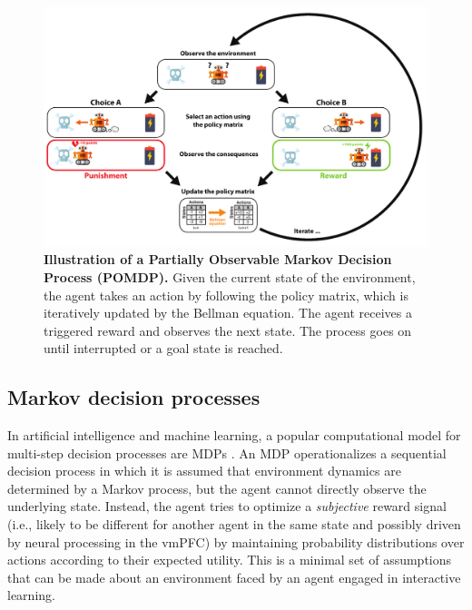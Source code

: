 \documentclass[10pt,letterpaper]{article}
\begin{document}
\begin{figure}[!h]
  \centering
  \includegraphics[width=1.\linewidth]{POMDP_Fig.pdf}
  \caption{\textbf{Illustration of a Partially Observable Markov Decision Process (POMDP).} Given the current state of the environment,
    the agent takes an action by following the policy matrix, which is iteratively updated by the Bellman equation. The agent receives a triggered reward and observes the next state. The process goes on until interrupted or a goal state is reached.}
  \label{fig:rl}
\end{figure}




\subsection{Markov decision processes}
In artificial intelligence and machine learning, a popular computational model for
multi-step decision processes are
MDPs \citep{sutton1998reinforcement}.
An MDP operationalizes a sequential decision process
in which it is assumed that environment dynamics are determined by a Markov process,
but the agent cannot directly observe the underlying state.
Instead, the agent tries to optimize a \textit{subjective} reward
signal (i.e., likely to be different for another agent in the same state
and possibly driven by neural processing in the vmPFC)
by maintaining probability distributions over actions according to their expected utility.
This is a minimal set of assumptions that can be made about an environment faced by an agent engaged in interactive learning.
\end{document}
